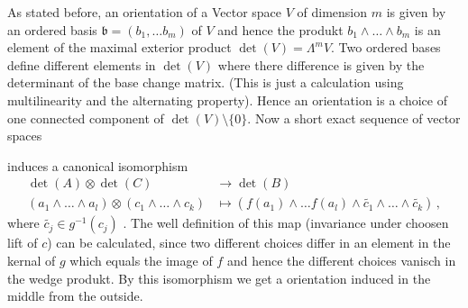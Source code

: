 \begin{definition}
	As stated before, an orientation of a Vector space $V$ of dimension $m$ is given by an ordered basis $\mathfrak{b}=(b_1,\dots b_m)$ of $V$ and hence the produkt $b_1\wedge \dots \wedge b_m$ is an element of the maximal exterior product $\det(V)=\Lambda^mV$. Two ordered bases define different elements in $\det(V)$ where there difference is given by the determinant of the base change matrix. (This is just a calculation using multilinearity and the alternating property). Hence an orientation is a choice of one connected component of $\det(V)\setminus \{0\}$. Now a short exact sequence of vector spaces 
\begin{center}
\end{center}
induces a canonical isomorphism 
	\begin{align*}
		 \det(A)\otimes \det(C)& \to \det(B)\\
		 (a_1\wedge \dots\wedge a_l) \otimes (c_1\wedge \dots \wedge c_k) &\mapsto (f(a_1)\wedge \dots f(a_l)\wedge \tilde{c_1}\wedge \dots \wedge \tilde{c_k})\, ,
	\end{align*} where $\tilde{c_j}\in g^{-1}(c_j)$ . The well definition of this map (invariance under choosen lift of $c$) can be calculated, since two different choices differ in an element in the kernal of $g$ which equals the image of $f$ and hence the different choices vanisch in the wedge produkt. By this isomorphism we get a orientation induced in the middle from the outside.
\end{definition}
